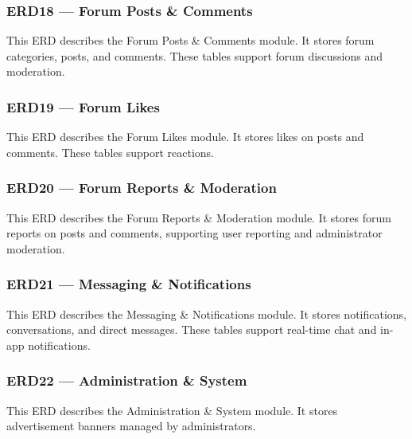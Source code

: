 
\subsubsection{ERD18 --- Forum Posts \& Comments}

This ERD describes the Forum Posts \& Comments module. It stores forum categories, posts, and comments. These tables support forum discussions and moderation.


\subsubsection{ERD19 --- Forum Likes}

This ERD describes the Forum Likes module. It stores likes on posts and comments. These tables support reactions.


\subsubsection{ERD20 --- Forum Reports \& Moderation}

This ERD describes the Forum Reports \& Moderation module. It stores forum reports on posts and comments, supporting user reporting and administrator moderation.


\subsubsection{ERD21 --- Messaging \& Notifications}

This ERD describes the Messaging \& Notifications module. It stores notifications, conversations, and direct messages. These tables support real-time chat and in-app notifications.


\subsubsection{ERD22 --- Administration \& System}

This ERD describes the Administration \& System module. It stores advertisement banners managed by administrators.

